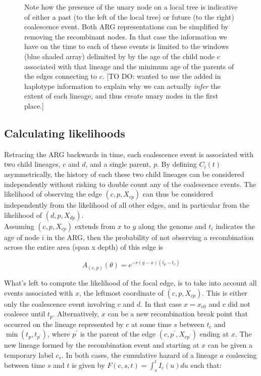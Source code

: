 \documentclass{article}
\begin{document}
\begin{figure}[!ht]
{Note how the presence of the unary node on a local tree is 
indicative of either a past (to the left of the local tree) 
or future (to the right) coalescence event. 
Both ARG representations can be simplified by removing the recombinant nodes. 
In that case the information we have on the time to each of these events is 
limited to the windows (blue shaded array) delimited by by the age of 
the child node $c$ associated with that lineage and the minimum age of 
the parents of the edges connecting to $c$. 
 [TO DO: wanted to use the 
added in haplotype information to explain why we can actually \textit{infer} the 
extent of each lineage, and thus create unary nodes in the first place.]
}
\label{fig:smc-unary}
\end{figure}



\subsection{Calculating likelihoods} \label{par:liks}

Retracing the ARG backwards in time, each coalescence event is associated with two child 
lineages, $c$ and $d$, and a single parent, $p$. By defining $C_i(t)$ asymmetrically, 
the history of each these two child lineages can be considered independently without 
risking to double count any of the coalescence events. The likelihood of 
observing the edge $(c, p, X_{cp})$ can thus be considered independently from 
the likelihood of all other edges, and in particular from the likelihood 
of $(d, p, X_{dp})$.\\

Assuming $(c, p, X_{cp})$ extends from $x$ to $y$ along the genome and $t_i$ 
indicates the age of 
node $i$ in the ARG, then the probability of not observing a recombination across the 
entire area (span x depth) of this edge is 

\begin{equation}\label{eq:span}
A_{(c, p)}(\theta) = e^{-r (y-x)(t_p - t_{c})}
\end{equation}

What's left to compute the likelihood of the focal edge, is to take into account 
all events associated with $x$, 
the leftmost coordinate of $(c, p, X_{cp})$. 
This is either only the 
coalescence event involving 
$c$ and $d$. In that case $x=x_{c0}$ and $c$ did not coalesce until $t_p$. 
Alternatively, $x$ can be a new recombination break point that 
occurred on the lineage represented by $c$ at some time $s$ between $t_{c}$ 
and $\min(t_p, t_{p^{\prime}})$, where $p^{\prime}$ is the parent of the 
edge $(c, p^{\prime}, X_{cp^{\prime}})$ ending at $x$. The new lineage formed 
by the recombination event and starting at $x$ can be given a temporary label 
$c_s$. In both cases, the cumulative hazard of a lineage $a$ coalescing 
between time $s$ and $t$ is given by $F(c, s, t) = \int_{s}^{t} I_{c}(u)du$ 
such that:
\end{document}
